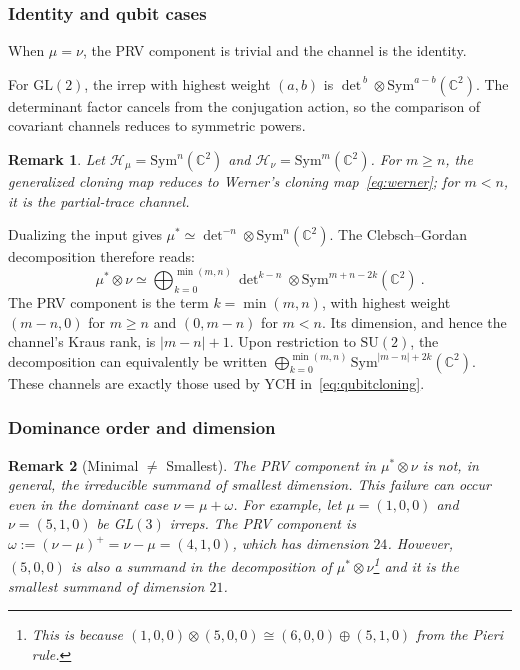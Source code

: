 \documentclass[a4paper,onecolumn,11pt]{quantumarticle}
\newtheorem{rem}{Remark}
\def\h{\mathcal{H}}
\begin{document}
\subsubsection{Identity and qubit cases}
When $\mu=\nu$, the PRV component is trivial and the channel is the identity.

For $\mathrm{GL}(2)$, the irrep with highest weight $(a,b)$ is
$\det\nolimits^{\,b}\otimes\mathrm{Sym}^{a-b}(\mathbb C^2)$.
The determinant factor cancels from the conjugation action, so the
comparison of covariant channels reduces to symmetric powers.
\begin{rem}
    Let $\h_\mu=\mathrm{Sym}^n(\mathbb{C}^2)$ and $\h_\nu= \mathrm{Sym}^m(\mathbb{C}^2)$. For $m\ge n$, the generalized cloning map reduces to Werner's cloning map~\eqref{eq:werner}; for $m<n$, it is the partial-trace channel.
\end{rem}
Dualizing the input gives
$\mu^*\simeq\det\nolimits^{-n}\otimes\mathrm{Sym}^n(\mathbb C^2)$.
The Clebsch--Gordan decomposition therefore reads:
\begin{equation}
    \mu^*\otimes\nu \simeq
    \bigoplus_{k=0}^{\min(m,n)}
    \det\nolimits^{k-n}\otimes\mathrm{Sym}^{m+n-2k}(\mathbb C^2)\ .
\end{equation}
The PRV component is the term $k=\min(m,n)$, with highest weight
$(m-n,0)$ for $m\ge n$ and $(0,m-n)$ for $m<n$.
Its dimension, and hence the channel's Kraus rank, is $|m-n|+1$.
Upon restriction to $\mathrm{SU}(2)$, the decomposition can equivalently
be written $\bigoplus_{k=0}^{\min(m,n)}\mathrm{Sym}^{|m-n|+2k}(\mathbb C^2)$.
These channels are exactly those used by YCH in~\eqref{eq:qubitcloning}.

\subsubsection{Dominance order and dimension}
\begin{rem}[Minimal $\neq$ Smallest]\label{rem:prv_not_dim_min}
The PRV component in \(\mu^*\otimes \nu\) is not, in general, the irreducible summand of smallest dimension. This failure can occur even in the dominant case $\nu=\mu+\omega$. For example, let $\mu=(1,0,0)$ and $\nu=(5,1,0)$ be GL\((3)\) irreps. The PRV component is $\omega:=(\nu-\mu)^+ = \nu-\mu=(4,1,0)$, which has dimension $24$. However, $(5,0,0)$ is also a summand in the decomposition of $\mu^*\otimes \nu$\footnote{This is because $(1,0,0)\otimes (5,0,0)\cong(6,0,0)\oplus (5,1,0)$ from the Pieri rule.} and it is the smallest summand of dimension $21$.
\end{rem}
\end{document}
